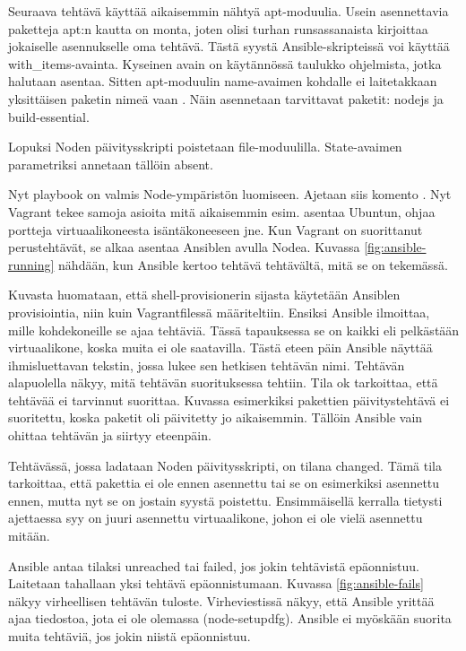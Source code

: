 Seuraava tehtävä käyttää aikaisemmin nähtyä apt-moduulia. Usein asennettavia paketteja apt:n kautta on monta, joten olisi turhan runsassanaista kirjoittaa jokaiselle asennukselle oma tehtävä. Tästä syystä Ansible-skripteissä voi käyttää with\_items-avainta. Kyseinen avain on käytännössä taulukko ohjelmista, jotka halutaan asentaa. Sitten apt-moduulin name-avaimen kohdalle ei laitetakkaan yksittäisen paketin nimeä vaan . Näin asennetaan tarvittavat paketit: nodejs ja build-essential.

Lopuksi Noden päivitysskripti poistetaan file-moduulilla. State-avaimen parametriksi annetaan tällöin absent.

Nyt playbook on valmis Node-ympäristön luomiseen. Ajetaan siis komento . Nyt Vagrant tekee samoja asioita mitä aikaisemmin esim. asentaa Ubuntun, ohjaa portteja virtuaalikoneesta isäntäkoneeseen jne. Kun Vagrant on suorittanut perustehtävät, se alkaa asentaa Ansiblen avulla Nodea. Kuvassa \ref{fig:ansible-running} nähdään, kun Ansible kertoo tehtävä tehtävältä, mitä se on tekemässä.

Kuvasta huomataan, että shell-provisionerin sijasta käytetään Ansiblen provisiointia, niin kuin Vagrantfilessä määriteltiin. Ensiksi Ansible ilmoittaa, mille kohdekoneille se ajaa tehtäviä. Tässä tapauksessa se on kaikki eli pelkästään virtuaalikone, koska muita ei ole saatavilla. Tästä eteen päin Ansible näyttää ihmisluettavan tekstin, jossa lukee sen hetkisen tehtävän nimi. Tehtävän alapuolella näkyy, mitä tehtävän suorituksessa tehtiin. Tila ok tarkoittaa, että tehtävää ei tarvinnut suorittaa. Kuvassa esimerkiksi pakettien päivitystehtävä ei suoritettu, koska paketit oli päivitetty jo aikaisemmin. Tällöin Ansible vain ohittaa tehtävän ja siirtyy eteenpäin.

Tehtävässä, jossa ladataan Noden päivitysskripti, on tilana changed. Tämä tila tarkoittaa, että pakettia ei ole ennen asennettu tai se on esimerkiksi asennettu ennen, mutta nyt se on jostain syystä poistettu. Ensimmäisellä kerralla tietysti ajettaessa syy on juuri asennettu virtuaalikone, johon ei ole vielä asennettu mitään.

Ansible antaa tilaksi unreached tai failed, jos jokin tehtävistä epäonnistuu. Laitetaan tahallaan yksi tehtävä epäonnistumaan. Kuvassa \ref{fig:ansible-fails} näkyy virheellisen tehtävän tuloste. Virheviestissä näkyy, että Ansible yrittää ajaa tiedostoa, jota ei ole olemassa (node-setupdfg). Ansible ei myöskään suorita muita tehtäviä, jos jokin niistä epäonnistuu.

